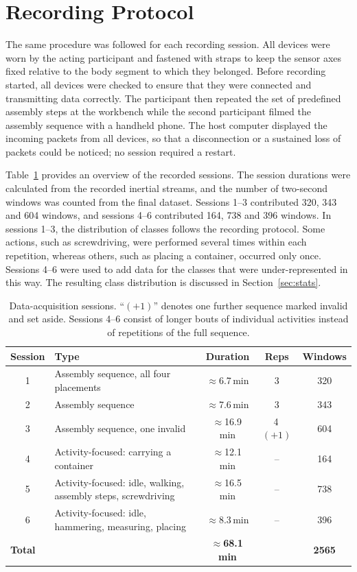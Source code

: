 \section{Recording Protocol}
\label{sec:protocol}

The same procedure was followed for each recording session. All devices
were worn by the acting participant and fastened with straps to keep the sensor
axes fixed relative to the body segment to which they belonged. Before recording
started, all devices were checked to ensure that they were connected and
transmitting data correctly. The participant then repeated the set of predefined
assembly steps at the workbench while the second participant filmed the assembly
sequence with a handheld phone. The host computer displayed the incoming packets
from all devices, so that a disconnection or a sustained loss of packets
could be noticed; no session required a restart.

Table~\ref{tab:sessions} provides an overview of the recorded sessions. The
session durations were calculated from the recorded inertial streams, and the
number of two-second windows was counted from the final dataset. Sessions 1--3
contributed 320, 343 and 604 windows, and sessions 4--6 contributed 164, 738 and
396 windows. In sessions 1--3, the distribution of classes follows the recording
protocol. Some actions, such as screwdriving, were performed several times within
each repetition, whereas others, such as placing a container, occurred only once.
Sessions 4--6 were used to add data for the classes that were under-represented
in this way. The resulting class distribution is discussed in
Section~\ref{sec:stats}.

\begin{table}[htbp]
\centering
\small
\setlength{\tabcolsep}{4pt}
\renewcommand{\arraystretch}{1.2}
\begin{tabular}{|c|p{5.6cm}|c|c|c|}
\hline
\textbf{Session} & \textbf{Type} & \textbf{Duration}
 & \textbf{Reps} & \textbf{Windows} \\
\hline
1 & Assembly sequence, all four placements & $\approx$6.7\,min & 3 & 320 \\
2 & Assembly sequence & $\approx$7.6\,min & 3 & 343 \\
3 & Assembly sequence, one invalid & $\approx$16.9\,min & 4\,$(+1)$ & 604 \\
4 & Activity-focused: carrying a container & $\approx$12.1\,min & -- & 164 \\
5 & Activity-focused: idle, walking, assembly steps, screwdriving & $\approx$16.5\,min & -- & 738 \\
6 & Activity-focused: idle, hammering, measuring, placing & $\approx$8.3\,min & -- & 396 \\
\hline
\multicolumn{2}{|l|}{\textbf{Total}} & \textbf{$\approx$68.1\,min} & & \textbf{2565} \\
\hline
\end{tabular}
\caption{Data-acquisition sessions. ``$(+1)$'' denotes one further sequence marked
invalid and set aside. Sessions 4--6 consist of longer bouts of individual
activities instead of repetitions of the full sequence.}
\label{tab:sessions}
\end{table}

